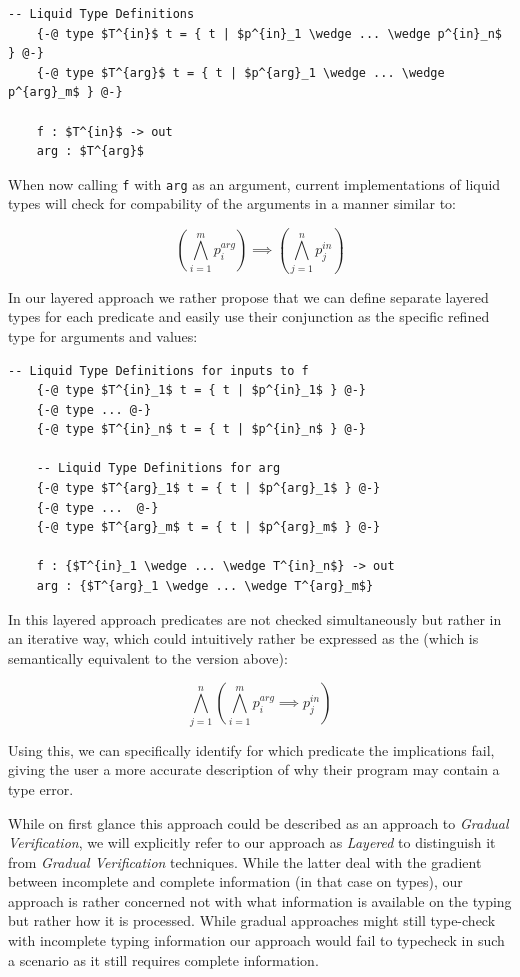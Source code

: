 \documentclass[acmsmall, review, screen]{acmart}
\begin{document}
\begin{lstlisting}[mathescape=true]
	-- Liquid Type Definitions
	{-@ type $T^{in}$ t = { t | $p^{in}_1 \wedge ... \wedge p^{in}_n$  } @-}
	{-@ type $T^{arg}$ t = { t | $p^{arg}_1 \wedge ... \wedge p^{arg}_m$ } @-}

	f : $T^{in}$ -> out 
	arg : $T^{arg}$
\end{lstlisting}

When now calling \texttt{f} with \texttt{arg} as an argument, current implementations of liquid types will check for compability of the arguments in a manner similar to:

$$ \left( \bigwedge^{m}_{i=1} p^{arg}_i \right) \implies \left( \bigwedge^{n}_{j=1} p^{in}_j \right) $$

In our layered approach we rather propose that we can define separate layered types for each predicate and easily use their conjunction as the specific refined type for arguments and values:

\begin{lstlisting}[mathescape=true]
	-- Liquid Type Definitions for inputs to f
	{-@ type $T^{in}_1$ t = { t | $p^{in}_1$ } @-}
	{-@ type ... @-}
	{-@ type $T^{in}_n$ t = { t | $p^{in}_n$ } @-}

	-- Liquid Type Definitions for arg
	{-@ type $T^{arg}_1$ t = { t | $p^{arg}_1$ } @-}
	{-@ type ...  @-}
	{-@ type $T^{arg}_m$ t = { t | $p^{arg}_m$ } @-}

	f : {$T^{in}_1 \wedge ... \wedge T^{in}_n$} -> out 
	arg : {$T^{arg}_1 \wedge ... \wedge T^{arg}_m$}
\end{lstlisting}


In this layered approach predicates are not checked simultaneously but rather in an iterative way, which could intuitively rather be expressed as the (which is semantically equivalent to the version above):

$$ \bigwedge^{n}_{j=1} \left( \bigwedge^{m}_{i=1} p^{arg}_i \implies  p^{in}_j \right) $$

Using this, we can specifically identify for which predicate the implications fail, giving the user a more accurate description of why their program may contain a type error.

While on first glance this approach could be described as an approach to \textit{Gradual Verification}, we will explicitly refer to our approach as \textit{Layered} to distinguish it from \textit{Gradual Verification} techniques. While the latter deal with the gradient between incomplete and complete information (in that case on types), our approach is rather concerned not with what information is available on the typing but rather how it is processed. While gradual approaches might still type-check with incomplete typing information our approach would fail to typecheck in such a scenario as it still requires complete information. 
\end{document}
